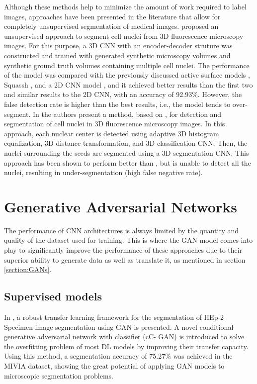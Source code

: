 Although these methods help to minimize the amount of work required to label images, approaches have been presented in the literature that allow for completely unsupervised segmentation of medical images. \citet{SOTA:3DCNN} proposed an unsupervised approach to segment cell nuclei from \ac{3D} fluorescence microscopy images. For this purpose, a \ac{3D} \ac{CNN} with an encoder-decoder struture was constructed and trained with generated synthetic microscopy volumes and synthetic ground truth volumes containing multiple cell nuclei. The performance of the model was compared with the previously discussed active surface models \cite{3D:active,active:inhmo}, Squassh \cite{squassh}, and a \ac{2D} \ac{CNN} model \cite{2dplus}, and it achieved better results than the first two and similar results to the \ac{2D} \ac{CNN}, with an accuracy of 92.93\%. However, the false detection rate is higher than the best results, i.e., the model tends to over-segment. In \cite{3d:detection} the authors present a method, based on \cite{SOTA:3DCNN}, for detection and segmentation of cell nuclei in \ac{3D} fluorescence microscopy images. In this approach, each nuclear center is detected using adaptive \ac{3D} histogram equalization, \ac{3D} distance transformation, and \ac{3D} classification \ac{CNN}. Then, the nuclei surrounding the seeds are segmented using a \ac{3D} segmentation \ac{CNN}. This approach has been shown to perform better than \cite{SOTA:3DCNN}, but is unable to detect all the nuclei, resulting in under-segmentation (high false negative rate). 

\section{Generative Adversarial Networks}

The performance of \ac{CNN} architectures is always limited by the quantity and quality of the dataset used for training. This is where the \ac{GAN} model comes into play to significantly improve the performance of these approaches due to their superior ability to generate data as well as translate it, as mentioned in section \ref{section:GANs}.

\subsection{Supervised models}

In \cite{cCGAN}, a robust transfer learning framework for the segmentation of HEp-2 Specimen image segmentation using \ac{GAN} is presented. A novel conditional generative adversarial network with classifier (cC- GAN) is introduced to solve the overfitting problem of most DL models by improving their transfer capacity. Using this method, a segmentation accuracy of 75.27\% was achieved in the MIVIA dataset, showing the great potential of applying \ac{GAN} models to microscopic segmentation problems.

